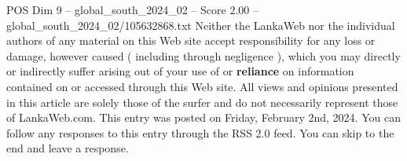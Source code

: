 \begin{textsample}{POS Dim 9 – global\_south\_2024\_02 – Score 2.00 – global\_south\_2024\_02/105632868.txt}
Neither the LankaWeb nor the individual authors of any material on this Web site accept responsibility for any loss or damage, however caused ( including through negligence ), which you may directly or indirectly suffer arising out of your use of or \textbf{reliance} on information contained on or accessed through this Web site.
All views and opinions presented in this article are solely those of the surfer and do not necessarily represent those of LankaWeb.com.
This entry was posted on Friday, February 2nd, 2024.
You can follow any responses to this entry through the RSS 2.0 feed.
You can skip to the end and leave a response.

\end{textsample}
